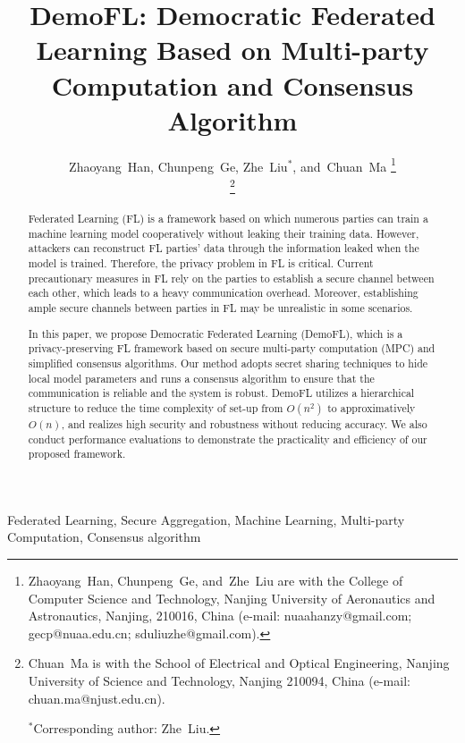 \documentclass[journal]{IEEEtran}
\begin{document}
\title {DemoFL: Democratic Federated Learning Based on Multi-party Computation and Consensus Algorithm}

\author{Zhaoyang~Han, 
        Chunpeng~Ge, 
        Zhe~Liu$^*$, 
        and~Chuan~Ma%
\thanks{Zhaoyang~Han, Chunpeng~Ge, and~Zhe~Liu are with the College of Computer Science and Technology, Nanjing University of Aeronautics and Astronautics, Nanjing, 210016, China (e-mail: nuaahanzy@gmail.com; gecp@nuaa.edu.cn; sduliuzhe@gmail.com).}

\thanks{Chuan~Ma is with the School of Electrical and Optical Engineering, Nanjing University of Science and Technology, Nanjing 210094, China (e-mail: chuan.ma@njust.edu.cn).

$^*$Corresponding author: Zhe~Liu.}
}

\maketitle

\begin{abstract}
Federated Learning (FL) is a framework based on which numerous parties can train a machine learning model cooperatively without leaking their training data. However, attackers can reconstruct FL parties' data through the information leaked when the model is trained. Therefore, the privacy problem in FL is critical. Current precautionary measures in FL rely on the parties to establish a secure channel between each other, which leads to a heavy communication overhead. Moreover, establishing ample secure channels between parties in FL may be unrealistic in some scenarios.

In this paper, we propose Democratic Federated Learning (DemoFL), which is a privacy-preserving FL framework based on secure multi-party computation (MPC) and simplified consensus algorithms. Our method adopts secret sharing techniques to hide local model parameters and runs a consensus algorithm to ensure that the communication is reliable and the system is robust. DemoFL utilizes a hierarchical structure to reduce the time complexity of set-up from $O(n^2)$ to approximatively $O(n)$, and realizes high security and robustness without reducing accuracy. We also conduct performance evaluations to demonstrate the practicality and efficiency of our proposed framework. 

\end{abstract}

\begin{IEEEkeywords}
    Federated Learning, Secure Aggregation, Machine Learning, Multi-party Computation, Consensus algorithm
\end{IEEEkeywords}
\end{document}
